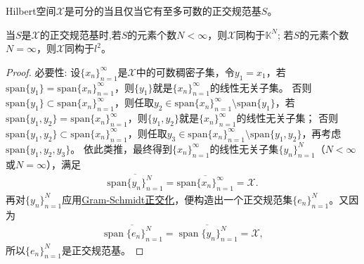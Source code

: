 \documentclass[../../main.tex]{subfiles}%
\begin{document}
\begin{theorem}
Hilbert空间$\mathscr{X}$是可分的当且仅当它有至多可数的正交规范基$S$。

当$S$是$\mathscr{X}$的正交规范基时,若$S$的元素个数$N < \infty$，则$\mathscr{X}$同构于$\mathbb{K}^N$;
若$S$的元素个数$N = \infty$，则$\mathscr{X}$同构于$l^2$。
\end{theorem}
\begin{proof}

{\heiti 必要性:} 设$\{x_n\}_{n=1}^{\infty}$是$\mathscr{X}$中的可数稠密子集，令$y_1=x_1$，若$\mathrm{span}\{ y_1 \} = \mathrm{span}\{ x_n \}_{n=1}^{\infty}$，则$\{ y_1 \}$就是$\{ x_n \}_{n=1}^{\infty}$的线性无关子集。
否则$\mathrm{span}\{ y_1 \} \subset \mathrm{span}\{ x_n \}_{n=1}^{\infty}$，则任取$y_2\in \mathrm{span}\{ x_n \}_{n=1}^{\infty}\setminus \mathrm{span}\{ y_1 \}$，若$\mathrm{span}\{ y_1,y_2 \} = \mathrm{span}\{ x_n \}_{n=1}^{\infty}$，则$\{ y_1,y_2 \}$就是$\{ x_n \}_{n=1}^{\infty}$的线性无关子集；
否则$\mathrm{span}\{ y_1,y_2 \} \subset \mathrm{span}\{ x_n \}_{n=1}^{\infty}$，则任取$y_3\in \mathrm{span}\{ x_n \}_{n=1}^{\infty}\setminus \mathrm{span}\{ y_1,y_2 \}$，再考虑$\mathrm{span}\{ y_1,y_2,y_3 \}$。
依此类推，最终得到$\{ x_n \}_{n=1}^{\infty}$的线性无关子集$\{ y_n \}_{n=1}^{N}$（$N<\infty$或$N=\infty$），满足
\begin{align*}
\overline{\mathrm{span}\{y_n\}_{n=1}^{N}}=\overline{\mathrm{span}\{x_n\}_{n=1}^{\infty}}=\mathscr{X}.
\end{align*}
再对$\{y_n\}_{n=1}^{N}$应用\hyperref[theorem:Gram-Schmidt正交化]{Gram-Schmidt正交化}，便构造出一个正交规范集$\{e_n\}_{n=1}^{N}$。又因为
\begin{align*}
\overline{\operatorname{span}\{e_n\}_{n=1}^{N}} = \overline{\operatorname{span}\{y_n\}_{n=1}^{N}} = \mathscr{X},
\end{align*}
所以$\{e_n\}_{n=1}^{N}$是正交规范基。


\end{proof}
\end{document}

